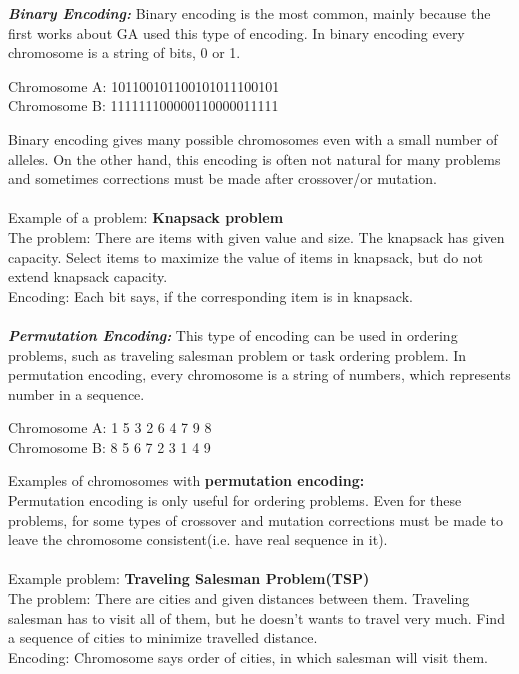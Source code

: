 \documentclass[a4paper, 12pt]{article}
\begin{document}
\textbf{\textit{Binary Encoding: }}
Binary encoding is the most common, mainly because the first works about GA used this type of encoding. In binary encoding every chromosome is
a string of bits, 0 or 1.
\begin{center}
Chromosome A: 101100101100101011100101\\
Chromosome B: 111111100000110000011111
\end{center}
Binary encoding gives many possible chromosomes even with a small number of alleles. On the other hand, this encoding is often not natural for 
many problems and sometimes corrections must be made after crossover/or mutation.\\~\\
Example of a problem:  \textbf{Knapsack problem}\\
The problem:  There are items with given value and size. The knapsack has given capacity. Select items to maximize the value of items in 
knapsack, but do not extend knapsack capacity.\\
Encoding: Each bit says, if the corresponding item is in knapsack.\\~\\
\textbf{\textit{Permutation Encoding: }}
This type of encoding can be used in ordering problems, such as traveling salesman problem or task ordering problem. In permutation encoding,
every chromosome is a string of numbers, which represents number in a sequence.
\begin{center}
Chromosome A: 1 5 3 2 6 4 7 9 8\\
Chromosome B: 8 5 6 7 2 3 1 4 9
\end{center}
Examples of chromosomes with \textbf{permutation encoding:}\\
Permutation encoding is only useful for ordering problems. Even for these problems, for some types of crossover and mutation corrections must
be made to leave the chromosome consistent(i.e. have real sequence in it).\\~\\
Example problem: \textbf{Traveling Salesman Problem(TSP)}\\
The problem: There are cities and given distances between them. Traveling salesman has to visit all of them, but he doesn't wants to travel very much. Find a sequence of cities to minimize travelled distance.\\
Encoding: Chromosome says order of cities, in which salesman will visit them.\\~\\
\end{document}
